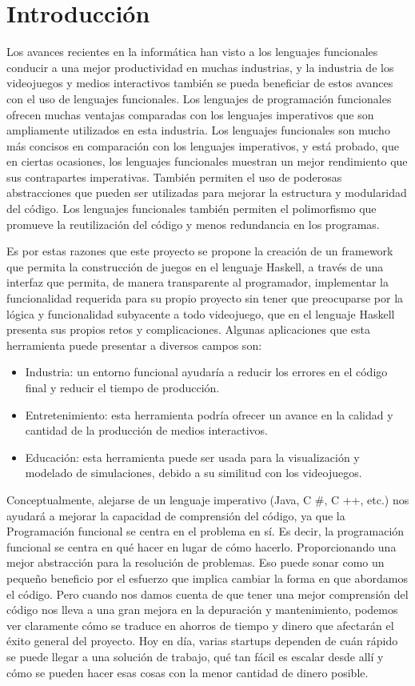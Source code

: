 \chapter{Introducción}

Los avances recientes en la informática han visto a los lenguajes funcionales conducir a una mejor productividad en muchas industrias, y la industria de los videojuegos y medios interactivos también se pueda beneficiar de estos avances con el uso de lenguajes funcionales. Los lenguajes de programación funcionales ofrecen muchas ventajas comparadas con los lenguajes imperativos que son ampliamente utilizados en esta industria. Los lenguajes funcionales son mucho más concisos en comparación con los lenguajes imperativos, y está probado, que en ciertas ocasiones, los lenguajes funcionales muestran un mejor rendimiento que sus contrapartes imperativas. También permiten el uso de poderosas abstracciones que pueden ser utilizadas para mejorar la estructura y modularidad del código. Los lenguajes funcionales también permiten el polimorfismo que promueve la reutilización del código y menos redundancia en los programas.

Es por estas razones que este proyecto se propone la creación de un framework que permita la construcción de juegos en el lenguaje Haskell, a través de una interfaz que permita, de manera transparente al programador, implementar la funcionalidad requerida para su propio proyecto sin tener que preocuparse por la lógica y funcionalidad subyacente a todo videojuego, que en el lenguaje Haskell presenta sus propios retos y complicaciones. Algunas aplicaciones que esta herramienta puede presentar a diversos campos son:

\begin{itemize}
\item Industria: un entorno funcional ayudaría a reducir los errores en el código final y reducir el tiempo de producción.
\item Entretenimiento: esta herramienta podría ofrecer un avance en la calidad y cantidad de la producción de medios interactivos.
\item Educación: esta herramienta puede ser usada para la visualización y modelado de simulaciones, debido a su similitud con los videojuegos.
\end{itemize}

Conceptualmente, alejarse de un lenguaje imperativo (Java, C #, C ++, etc.) nos ayudará a mejorar la capacidad de comprensión del código, ya que la Programación funcional se centra en el problema en sí. Es decir, la programación funcional se centra en qué hacer en lugar de cómo hacerlo. Proporcionando una mejor abstracción para la resolución de problemas. Eso puede sonar como un pequeño beneficio por el esfuerzo que implica cambiar la forma en que abordamos el código. Pero cuando nos damos cuenta de que tener una mejor comprensión del código nos lleva a una gran mejora en la depuración y mantenimiento, podemos ver claramente cómo se traduce en ahorros de tiempo y dinero que afectarán el éxito general del proyecto. Hoy en día, varias startups dependen de cuán rápido se puede llegar a una solución de trabajo, qué tan fácil es escalar desde allí y cómo se pueden hacer esas cosas con la menor cantidad de dinero posible.

